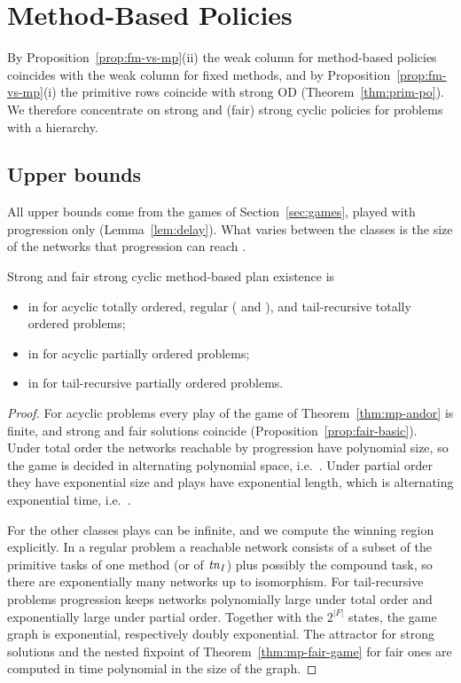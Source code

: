 \section{Method-Based Policies}\label{sec:policies}

By Proposition~\ref{prop:fm-vs-mp}(ii) the weak column for method-based policies coincides with the
weak column for fixed methods, and by Proposition~\ref{prop:fm-vs-mp}(i) the primitive rows
coincide with strong OD (Theorem~\ref{thm:prim-po}). We therefore concentrate on strong and
(fair) strong cyclic policies for problems with a hierarchy.

\subsection{Upper bounds}

All upper bounds come from the games of Section~\ref{sec:games}, played with progression only
(Lemma~\ref{lem:delay}). What varies between the classes is the size of the networks that
progression can reach \parencite{alford:et:al:icaps-15}.

\begin{theorem}\label{thm:mp-upper}
  Strong and fair strong cyclic method-based plan existence is
  \begin{itemize}
    \item in \EXPTIME{} for acyclic totally ordered, regular (\REG{} and \REGtn), and
      tail-recursive totally ordered problems;
    \item in \EXPSPACE{} for acyclic partially ordered problems;
    \item in \TWOEXP{} for tail-recursive partially ordered problems.
  \end{itemize}
\end{theorem}

\begin{proof}
  For acyclic problems every play of the game of Theorem~\ref{thm:mp-andor} is finite, and strong
  and fair solutions coincide (Proposition~\ref{prop:fair-basic}). Under total order the networks
  reachable by progression have polynomial size, so the game is decided in alternating polynomial
  space, i.e.\ \EXPTIME. Under partial order they have exponential size and plays have exponential
  length, which is alternating exponential time, i.e.\ \EXPSPACE.

  For the other classes plays can be infinite, and we compute the winning region explicitly. In a
  regular problem a reachable network consists of a subset of the primitive tasks of one method
  (or of $\mathit{tn}_I$) plus possibly the compound task, so there are exponentially many networks up to
  isomorphism. For tail-recursive problems progression keeps networks polynomially large under total
  order and exponentially large under partial order. Together with the $2^{|F|}$ states, the game
  graph is exponential, respectively doubly exponential. The attractor for strong solutions and the
  nested fixpoint of Theorem~\ref{thm:mp-fair-game} for fair ones are computed in time polynomial in
  the size of the graph.
\end{proof}

